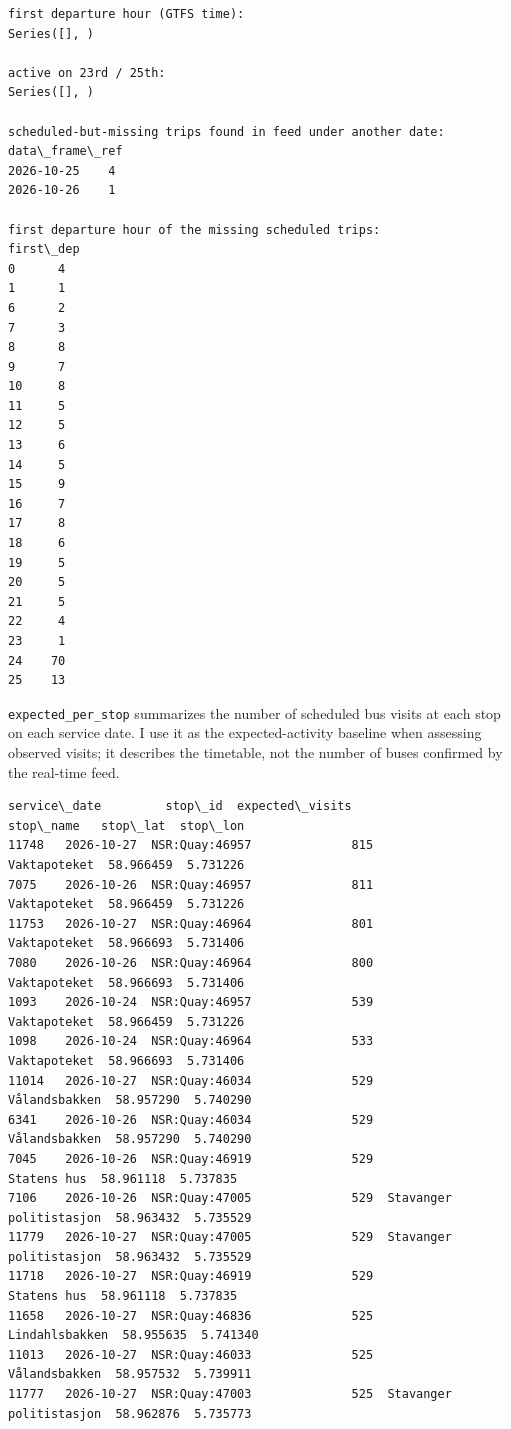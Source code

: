 \documentclass[11pt]{article}
\begin{document}
    \begin{Verbatim}[commandchars=\\\{\}]
first departure hour (GTFS time):
Series([], )

active on 23rd / 25th:
Series([], )

scheduled-but-missing trips found in feed under another date:
data\_frame\_ref
2026-10-25    4
2026-10-26    1

first departure hour of the missing scheduled trips:
first\_dep
0      4
1      1
6      2
7      3
8      8
9      7
10     8
11     5
12     5
13     6
14     5
15     9
16     7
17     8
18     6
19     5
20     5
21     5
22     4
23     1
24    70
25    13
    \end{Verbatim}

    \texttt{expected\_per\_stop} summarizes the number of scheduled bus
visits at each stop on each service date. I use it as the
expected-activity baseline when assessing observed visits; it describes
the timetable, not the number of buses confirmed by the real-time feed.

    
    \begin{Verbatim}[commandchars=\\\{\}]
      service\_date         stop\_id  expected\_visits                stop\_name   stop\_lat  stop\_lon
11748   2026-10-27  NSR:Quay:46957              815             Vaktapoteket  58.966459  5.731226
7075    2026-10-26  NSR:Quay:46957              811             Vaktapoteket  58.966459  5.731226
11753   2026-10-27  NSR:Quay:46964              801             Vaktapoteket  58.966693  5.731406
7080    2026-10-26  NSR:Quay:46964              800             Vaktapoteket  58.966693  5.731406
1093    2026-10-24  NSR:Quay:46957              539             Vaktapoteket  58.966459  5.731226
1098    2026-10-24  NSR:Quay:46964              533             Vaktapoteket  58.966693  5.731406
11014   2026-10-27  NSR:Quay:46034              529            Vålandsbakken  58.957290  5.740290
6341    2026-10-26  NSR:Quay:46034              529            Vålandsbakken  58.957290  5.740290
7045    2026-10-26  NSR:Quay:46919              529              Statens hus  58.961118  5.737835
7106    2026-10-26  NSR:Quay:47005              529  Stavanger politistasjon  58.963432  5.735529
11779   2026-10-27  NSR:Quay:47005              529  Stavanger politistasjon  58.963432  5.735529
11718   2026-10-27  NSR:Quay:46919              529              Statens hus  58.961118  5.737835
11658   2026-10-27  NSR:Quay:46836              525           Lindahlsbakken  58.955635  5.741340
11013   2026-10-27  NSR:Quay:46033              525            Vålandsbakken  58.957532  5.739911
11777   2026-10-27  NSR:Quay:47003              525  Stavanger politistasjon  58.962876  5.735773
    \end{Verbatim}
\end{document}
